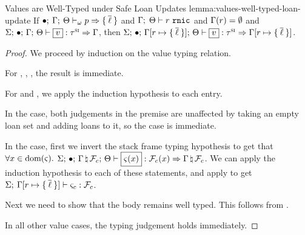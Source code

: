 \begin{oxlemma}{Values are Well-Typed under Safe Loan Updates}
  {lemma:values-well-typed-loan-update} If
  $\bullet; \: \Gamma; \: \Theta \vdash_{\omega} p \Rightarrow 
    \{ \: \overline{\ell} \: \} $ and
  $\Gamma; \; \Theta \vdash r \ \mathtt{rnic}$ and
  $\Gamma(r) = \emptyset$ and
  $\oxtypjudge{\oxglobalctx}{\oxemptyctx}{\oxkontctx}{\oxvarctx}
  {\oxvalue}{\oxsitype}{\oxvarctx}$, then
  $\oxtypjudge{\oxglobalctx}{\oxemptyctx}{\oxkontctx}{ \oxupdate{\oxvarctx}{
      \oxloanctxentry{\oxcprov}{ \oxset{\overline{\oxloan}} } }
  }{\oxvalue}{\oxsitype}{ \oxupdate{\oxvarctx}{ \oxloanctxentry{\oxcprov}{
        \oxset{\overline{\oxloan}} } } }$.
\end{oxlemma}

\begin{proof}
  We proceed by induction on the value typing relation.

  For , , , the result is
  immediate.

  For  and , we apply the induction
  hypothesis to each entry.

  \vspace{1em}
  \noindent \framebox[\textwidth]{
    \figuresize
    \begin{mathpar}
      \TPointer
    \end{mathpar}
  }
  \vspace{1em}

  In the  case, both judgements in the premise are unaffected
  by taking an empty loan set and adding loans to it, so the case is immediate.

  \vspace{1em}
  \noindent \framebox[\textwidth]{
    \figuresize
    \begin{mathpar}
      \TClosureVal
    \end{mathpar}
  }
  \vspace{1em}

  In the  case, first we invert the stack frame typing
  hypothesis to get that $\forall x \in \textrm{dom}(\varsigma).$
  $\oxtypjudge{\oxglobalctx}{\oxemptyctx}{\oxkontctx}{
    \oxnewframe{\oxvarctx}{\oxframe_c} }{\oxstackframe(x)}{\oxframe_c(x)}{
    \oxnewframe{\oxvarctx}{\oxframe_c} }$. We can apply the induction hypothesis
  to each of these statements, and apply  to get
  $\Sigma; \: 
    \Gamma[r \mapsto \{ \: \overline{\ell} \: \}]
   \vdash \varsigma_c : \mathcal{F}_c$.

  Next we need to show that the body remains well typed. This follows from
  .

  In all other value cases, the typing judgement holds immediately.
\end{proof}

